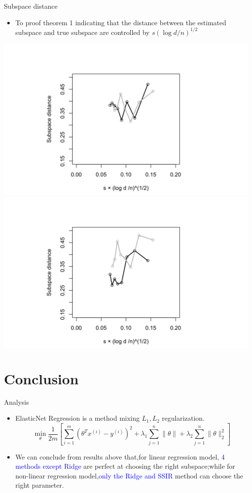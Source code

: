 \documentclass{beamer}
\begin{document}
\begin{frame}{Subspace distance}
 \begin{itemize}
     \item To proof theorem 1 indicating that the distance between the estimated subspace and true subspace are controlled by $s(\log d / n)^{1 / 2}$
 \end{itemize}
 
 \centering \includegraphics[scale=0.1]{41.png}
 \includegraphics[scale=0.1]{42.png}
\end{frame}

\section{Conclusion}
\begin{frame}{Analysis}
    \begin{itemize}
        \item ElasticNet Regression is a method mixing $ L_1,L_2$ regularization.
$$\min _{\theta} \frac{1}{2 m}\left[\sum_{i=1}^{m}\left(\theta^{T} x^{(i)}-y^{(i)}\right)^{2}+\lambda_{1} \sum_{j=1}^{n}\|\theta\|+\lambda_{2} \sum_{j=1}^{n}\|\theta\|_{2}^{2}\right]$$
      \item We can conclude from results above that,for linear regression model, \textcolor{blue}{4 methods except Ridge} are perfect at choosing the right subspace;while for non-linear regression model,\textcolor{blue}{only the Ridge and SSIR} method can choose the right parameter.
    \end{itemize}
\end{frame}
\end{document}
